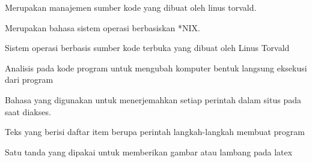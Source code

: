 Merupakan manajemen sumber kode yang dibuat oleh linus torvald.

Merupakan bahasa sistem operasi berbasiskan *NIX.

Sistem operasi berbasis sumber kode terbuka yang dibuat oleh Linus Torvald

Analisis pada kode program untuk mengubah komputer bentuk langsung eksekusi dari program

Bahasa yang digunakan untuk menerjemahkan setiap perintah dalam situs pada saat diakses.

Teks yang berisi daftar item berupa perintah langkah-langkah membuat program

 Satu tanda yang dipakai untuk memberikan gambar atau lambang pada latex